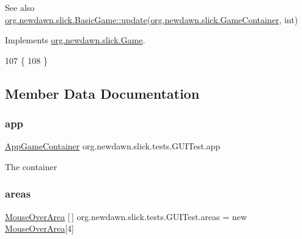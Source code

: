 \begin{DoxySeeAlso}{See also}
\mbox{\hyperlink{classorg_1_1newdawn_1_1slick_1_1_basic_game_acfe6fa05aef83bff1631af91a3e4bd20}{org.\+newdawn.\+slick.\+Basic\+Game\+::update}}(\mbox{\hyperlink{classorg_1_1newdawn_1_1slick_1_1_game_container}{org.\+newdawn.\+slick.\+Game\+Container}}, int) 
\end{DoxySeeAlso}


Implements \mbox{\hyperlink{interfaceorg_1_1newdawn_1_1slick_1_1_game_ab07b2e9463ee4631620dde0de25bdee8}{org.\+newdawn.\+slick.\+Game}}.


\begin{DoxyCode}
107                                                            \{
108     \}
\end{DoxyCode}


\subsection{Member Data Documentation}
\mbox{\label{classorg_1_1newdawn_1_1slick_1_1tests_1_1_g_u_i_test_ab8fc86430409e7a33c9f89928ff238b2}} 
\subsubsection{\texorpdfstring{app}{app}}
{\footnotesize\ttfamily \mbox{\hyperlink{classorg_1_1newdawn_1_1slick_1_1_app_game_container}{App\+Game\+Container}} org.\+newdawn.\+slick.\+tests.\+G\+U\+I\+Test.\+app\hspace{0.3cm}{\ttfamily [private]}}

The container \mbox{\label{classorg_1_1newdawn_1_1slick_1_1tests_1_1_g_u_i_test_a45e7638907d2d4662aca08ffa006a326}} 
\subsubsection{\texorpdfstring{areas}{areas}}
{\footnotesize\ttfamily \mbox{\hyperlink{classorg_1_1newdawn_1_1slick_1_1gui_1_1_mouse_over_area}{Mouse\+Over\+Area}} \mbox{[}$\,$\mbox{]} org.\+newdawn.\+slick.\+tests.\+G\+U\+I\+Test.\+areas = new \mbox{\hyperlink{classorg_1_1newdawn_1_1slick_1_1gui_1_1_mouse_over_area}{Mouse\+Over\+Area}}\mbox{[}4\mbox{]}\hspace{0.3cm}{\ttfamily [private]}}

